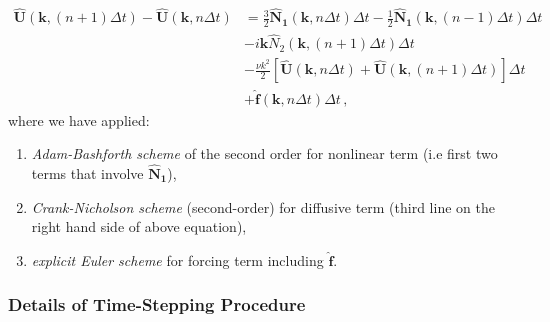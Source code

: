 \documentclass{pracamgren}
\begin{document}
\begin{enumerate}
\begin{align}
\mathbf{\hat{U}}(\mathbf{k}, (n+1) \Delta t) - \mathbf{\hat{U}}(\mathbf{k}, n \Delta t)
&= \frac{3}{2} \mathbf{\hat{N}_1}(\mathbf{k}, n \Delta t) \Delta t - \frac{1}{2} \mathbf{\hat{N}_1}(\mathbf{k}, (n-1) \Delta t) \Delta t \\
&- i \mathbf{k} \hat{N}_2 (\mathbf{k}, (n+1) \Delta t) \Delta t \\
&- \frac{\nu k^2}{2} \left[ \mathbf{\hat{U}}(\mathbf{k}, n \Delta t) + \mathbf{\hat{U}}(\mathbf{k}, (n+1) \Delta t) \right] \Delta t \\
&+ \mathbf{\hat{f}}(\mathbf{k}, n \Delta t) \Delta t \, ,
\label{eqn:psproc-4}
\end{align}
where we have applied: 
\begin{enumerate}
\item \emph{Adam-Bashforth scheme} of the second order for  nonlinear term (i.e first two terms that involve $\mathbf{\hat{N}_1}$),
\item \emph{Crank-Nicholson scheme} (second-order) for diffusive term (third line on the right hand side of above equation),
\item \emph{explicit Euler scheme} for forcing term including $\mathbf{\hat{f}}$.
\end{enumerate}
\end{enumerate}

\subsubsection{Details of Time-Stepping Procedure}
\end{document}
